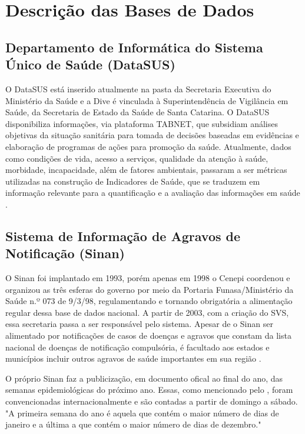 \section{Descrição das Bases de Dados}

\subsection{Departamento de Informática do Sistema Único de Saúde (DataSUS)}

O \acrshort{DataSUS} está inserido atualmente na pasta da Secretaria Executiva do Ministério da Saúde e a \acrfull{Dive} é vinculada à Superintendência de Vigilância em Saúde, da Secretaria de Estado da Saúde de Santa Catarina. O \acrshort{DataSUS} disponibiliza informações, via plataforma TABNET, que subsidiam  análises objetivas da situação sanitária para tomada de decisões baseadas em evidências e elaboração de programas de ações para promoção da saúde. Atualmente, dados como condições de vida, acesso a serviços, qualidade da atenção à saúde, morbidade, incapacidade, além de fatores ambientais, passaram a ser métricas utilizadas na construção de Indicadores de Saúde, que se traduzem em informação relevante para a quantificação e a avaliação das informações em saúde \cite{TABNETMinisterio}.

\subsection{Sistema de Informação de Agravos de Notificação (Sinan)}

O \acrfull{Sinan} foi implantado em 1993, porém apenas em 1998 o \acrfull{Cenepi} coordenou e organizou as três esferas do governo por meio da Portaria \acrshort{Funasa}/Ministério da Saúde n.º 073 de 9/3/98, regulamentando  e tornando obrigatória a alimentação regular dessa base de dados nacional. A partir de 2003, com a criação do \acrfull{SVS}, essa secretaria passa a ser responsável pelo sistema. Apesar de o \acrshort{Sinan} ser alimentado por notificações  de casos de doenças e agravos que constam da lista nacional de doenças de notificação compulsória, é facultado aos estados e municípios incluir outros agravos de saúde importantes em sua região \cite{SINANWEB, SINAN07Ministerio}.

\indent O próprio \acrshort{Sinan} faz a publicização, em documento ofical ao final do ano, das semanas epidemiológicas do próximo ano. Essas, como mencionado pelo , foram convencionadas internacionalmente e são contadas a partir de domingo a sábado. "A primeira semana do ano é aquela que contém o maior número de dias de janeiro e a última a que contém o maior número de dias de dezembro."

